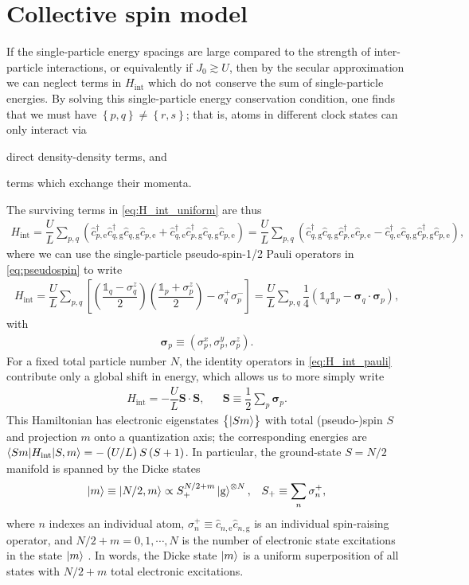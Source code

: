 \documentclass[aps,notitlepage,nofootinbib,11pt]{revtex4-1}
\renewcommand{\t}{\text} %
\newcommand{\f}[2]{\dfrac{#1}{#2}} %
\newcommand{\p}[1]{\left(#1\right)} %
\renewcommand{\sp}[1]{\left[#1\right]} %
\renewcommand{\set}[1]{\left\{#1\right\}} %
\renewcommand{\v}{\bm} %
\renewcommand{\c}{\cdot} %
\newcommand{\bk}{\braket} %
\newcommand{\g}{\text{g}} %
\newcommand{\e}{\text{e}}
\newcommand{\1}{\mathds{1}}
\begin{document}
\section{Collective spin model}

If the single-particle energy spacings are large compared to the
strength of inter-particle interactions, or equivalently if
$J_0\gtrsim U$, then by the secular approximation we can neglect terms
in $H_{\t{int}}$ which do not conserve the sum of single-particle
energies.  By solving this single-particle energy conservation
condition, one finds that we must have $\set{p,q}\ne\set{r,s}$; that
is, atoms in different clock states can only interact via
\begin{enumerate*}[label=(\roman*)]
\item direct density-density terms, and
\item terms which exchange their momenta.
\end{enumerate*}
The surviving terms in \eqref{eq:H_int_uniform} are thus
\begin{align}
  H_{\t{int}}
  = \f{U}{L} \sum_{p,q}
  \p{\hat c_{p,\e}^\dag \hat c_{q,\g}^\dag \hat c_{q,\g} \hat c_{p,\e}
    + \hat c_{q,\e}^\dag \hat c_{p,\g}^\dag \hat c_{q,\g} \hat c_{p,\e}}
  = \f{U}{L} \sum_{p,q}
  \p{\hat c_{q,\g}^\dag \hat c_{q,\g} \hat c_{p,\e}^\dag \hat c_{p,\e}
    - \hat c_{q,\e}^\dag \hat c_{q,\g} \hat c_{p,\g}^\dag \hat c_{p,\e}},
\end{align}
where we can use the single-particle pseudo-spin-1/2 Pauli operators
in \eqref{eq:pseudospin} to write
\begin{align}
  H_{\t{int}} = \f{U}{L} \sum_{p,q}
  \sp{\p{\f{\1_q-\sigma_q^z}{2}} \p{\f{\1_p+\sigma_p^z}{2}}
    - \sigma_q^+ \sigma_p^-}
  = \f{U}{L} \sum_{p,q}\f14\p{\1_q \1_p - \v\sigma_q\c\v\sigma_p},
  \label{eq:H_int_pauli}
\end{align}
with
\begin{align}
  \v{\sigma}_p \equiv \p{\sigma_p^x,\sigma_p^y,\sigma_p^z}.
\end{align}
For a fixed total particle number $N$, the identity operators in
\eqref{eq:H_int_pauli} contribute only a global shift in energy, which
allows us to more simply write
\begin{align}
  H_{\t{int}} = - \f{U}{L} \v S\c\v S,
  &&
  \v S \equiv \f12 \sum_p \v{\sigma}_p.
\end{align}
This Hamiltonian has electronic eigenstates $\set{\ket{Sm}}$ with
total (pseudo-)spin $S$ and projection $m$ onto a quantization axis;
the corresponding energies are
$\bk{Sm|H_{\t{int}}|S,m}=-\p{U/L}S\p{S+1}$.  In particular, the
ground-state $S=N/2$ manifold is spanned by the Dicke states
\begin{align}
  \ket{m} \equiv \ket{N/2,m} \propto S_+^{N/2+m} \ket{\g}^{\otimes N},
  &&
  S_+ \equiv \sum_n \sigma_n^+,
  \label{eq:dicke_states}
\end{align}
where $n$ indexes an individual atom,
$\sigma_n^+\equiv\hat c_{n,\e}\hat c_{n,\g}$ is an individual
spin-raising operator, and $N/2+m=0,1,\cdots,N$ is the number of
electronic state excitations in the state $\ket{m}$
\cite{swallows2011suppression}.  In words, the Dicke state $\ket{m}$
is a uniform superposition of all states with $N/2+m$ total electronic
excitations.
\end{document}
